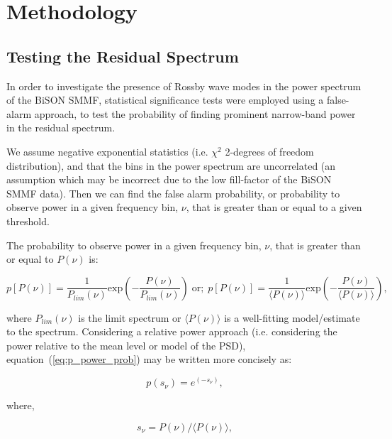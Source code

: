 \section{Methodology}\label{sec:r-mode_method}

\subsection{Testing the Residual Spectrum}
In order to investigate the presence of Rossby wave modes in the power spectrum of the BiSON SMMF, statistical significance tests were employed using a false-alarm approach, to test the probability of finding prominent narrow-band power in the residual spectrum.

We assume negative exponential statistics (i.e. $\chi^2$ 2-degrees of freedom distribution), and that the bins in the power spectrum are uncorrelated (an assumption which may be incorrect due to the low fill-factor of the BiSON SMMF data). Then we can find the false alarm probability, or probability to observe power in a given frequency bin, $\nu$, that is greater than or equal to a given threshold.

The probability to observe power in a given frequency bin, $\nu$, that is greater than or equal to $P(\nu)$ is:

\begin{equation}
p[P(\nu)] = \frac{1}{P_{lim}(\nu)} \mathrm{exp}\left(-\frac{P(\nu)}{P_{lim}(\nu)}\right) \; \mathrm{or; } \; p[P(\nu)] = \frac{1}{\langle P(\nu) \rangle} \mathrm{exp}\left(-\frac{P(\nu)}{\langle P(\nu) \rangle}\right),
\label{eq:p_power_prob}
\end{equation}


where $P_{lim}(\nu)$ is the limit spectrum or $\langle P(\nu) \rangle$ is a well-fitting model/estimate to the spectrum. Considering a relative power approach (i.e. considering the power relative to the mean level or model of the PSD), equation~(\ref{eq:p_power_prob}) may be written more concisely as:

\begin{equation}
p(s_{\nu}) = e^{(-s_{\nu})},
\label{eq:p_power_prob_concise}
\end{equation}

where,

\begin{equation}
s_{\nu} = P(\nu)/\langle P(\nu) \rangle,
\label{eq:s_v}
\end{equation}

